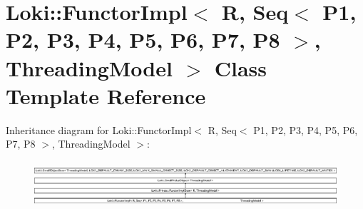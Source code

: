 \hypertarget{classLoki_1_1FunctorImpl_3_01R_00_01Seq_3_01P1_00_01P2_00_01P3_00_01P4_00_01P5_00_01P6_00_01P7_06c19e0651c71b6e2b0b1938538813ae6}{}\section{Loki\+:\+:Functor\+Impl$<$ R, Seq$<$ P1, P2, P3, P4, P5, P6, P7, P8 $>$, Threading\+Model $>$ Class Template Reference}
\label{classLoki_1_1FunctorImpl_3_01R_00_01Seq_3_01P1_00_01P2_00_01P3_00_01P4_00_01P5_00_01P6_00_01P7_06c19e0651c71b6e2b0b1938538813ae6}
Inheritance diagram for Loki\+:\+:Functor\+Impl$<$ R, Seq$<$ P1, P2, P3, P4, P5, P6, P7, P8 $>$, Threading\+Model $>$\+:\begin{figure}[H]
\begin{center}
\leavevmode
\includegraphics[height=1.751368cm]{classLoki_1_1FunctorImpl_3_01R_00_01Seq_3_01P1_00_01P2_00_01P3_00_01P4_00_01P5_00_01P6_00_01P7_06c19e0651c71b6e2b0b1938538813ae6}
\end{center}
\end{figure}
